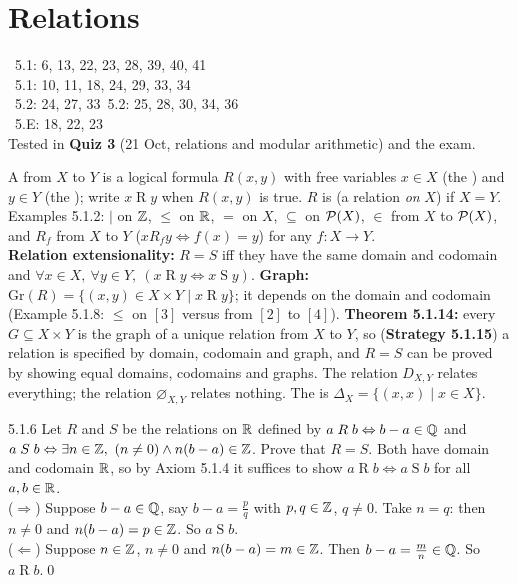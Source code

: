 \chapter{Relations}
%
{\fE\ 5.1: 6, 13, 22, 23, 28, 39, 40, 41\\ \fR\ 5.1: 10, 11, 18, 24, 29, 33, 34\\ \fE\ 5.2: 24, 27, 33\quad \fR\ 5.2: 25, 28, 30, 34, 36\\ \fE\ 5.E: 18, 22, 23\\ Tested in \textbf{Quiz 3} (21 Oct, relations and modular arithmetic) and the exam.}


\begin{key}
A  from $X$ to $Y$ is a logical formula $R(x,y)$ with free variables $x\in X$ (the ) and $y\in Y$ (the ); write $x\mathrel Ry$ when $R(x,y)$ is true. $R$ is  (a relation \emph{on} $X$) if $X=Y$. Examples 5.1.2: $\mid$ on $\mathbb{Z}$, $\le$ on $\mathbb{R}$, $=$ on $X$, $\subseteq$ on $\mathcal{P}(X)$, $\in$ from $X$ to $\mathcal{P}(X)$, and $R_f$ from $X$ to $Y$ ($x\mathrel{R_f}y\Leftrightarrow f(x)=y$) for any $f:X\to Y$.\\
\textbf{Relation extensionality:} $R=S$ iff they have the same domain and codomain and $\forall x\in X,\ \forall y\in Y,\ (x\mathrel Ry\Leftrightarrow x\mathrel Sy)$. \textbf{Graph:} $\mathrm{Gr}(R)=\{(x,y)\in X\times Y\mid x\mathrel Ry\}$; it depends on the domain and codomain (Example 5.1.8: $\le$ on $[3]$ versus from $[2]$ to $[4]$). \textbf{Theorem 5.1.14:} every $G\subseteq X\times Y$ is the graph of a unique relation from $X$ to $Y$, so (\textbf{Strategy 5.1.15}) a relation is specified by domain, codomain and graph, and $R=S$ can be proved by showing equal domains, codomains and graphs. The  relation $D_{X,Y}$ relates everything; the  relation $\varnothing_{X,Y}$ relates nothing. The  is $\Delta_X=\{(x,x)\mid x\in X\}$.
\end{key}

\begin{bookex}[essential]{5.1.6}
Let $R$ and $S$ be the relations on $\mathbb{R}$ defined by $a\mathrel Rb\Leftrightarrow b-a\in\mathbb{Q}$ and $a\mathrel Sb\Leftrightarrow\exists n\in\mathbb{Z},\ (n\ne0)\wedge n(b-a)\in\mathbb{Z}$. Prove that $R=S$.
\solution
Both have domain and codomain $\mathbb{R}$, so by Axiom 5.1.4 it suffices to show $a\mathrel Rb\Leftrightarrow a\mathrel Sb$ for all $a,b\in\mathbb{R}$.\\
($\Rightarrow$) Suppose $b-a\in\mathbb{Q}$, say $b-a=\frac pq$ with $p,q\in\mathbb{Z}$, $q\ne0$. Take $n=q$: then $n\ne0$ and $n(b-a)=p\in\mathbb{Z}$. So $a\mathrel Sb$.\\
($\Leftarrow$) Suppose $n\in\mathbb{Z}$, $n\ne0$ and $n(b-a)=m\in\mathbb{Z}$. Then $b-a=\frac mn\in\mathbb{Q}$. So $a\mathrel Rb$.\qed
\end{bookex}

